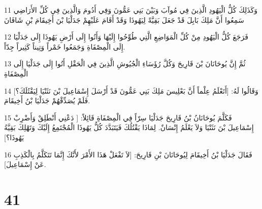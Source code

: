 \par 11 وَكَذَلِكَ كُلُّ الْيَهُودِ الَّذِينَ فِي مُوآبَ وَبَيْنَ بَنِي عَمُّونَ وَفِي أَدُومَ وَالَّذِينَ فِي كُلِّ الأَرَاضِي سَمِعُوا أَنَّ مَلِكَ بَابِلَ قَدْ جَعَلَ بَقِيَّةً لِيَهُوذَا وَقَدْ أَقَامَ عَلَيْهِمْ جَدَلْيَا بْنَ أَخِيقَامَ بْنِ شَافَانَ
\par 12 فَرَجَعَ كُلُّ الْيَهُودِ مِنْ كُلِّ الْمَوَاضِعِ الَّتِي طُوِّحُوا إِلَيْهَا وَأَتُوا إِلَى أَرْضِ يَهُوذَا إِلَى جَدَلْيَا إِلَى الْمِصْفَاةِ وَجَمَعُوا خَمْراً وَتِيناً كَثِيراً جِدّاً.
\par 13 ثُمَّ إِنَّ يُوحَانَانَ بْنَ قَارِيحَ وَكُلَّ رُؤَسَاءِ الْجُيُوشِ الَّذِينَ فِي الْحَقْلِ أَتُوا إِلَى جَدَلْيَا إِلَى الْمِصْفَاةِ
\par 14 وَقَالُوا لَهُ: [أَتَعْلَمُ عِلْماً أَنَّ بَعْلِيسَ مَلِكَ بَنِي عَمُّونَ قَدْ أَرْسَلَ إِسْمَاعِيلَ بْنَ نَثَنْيَا لِيَقْتُلَكَ؟] فَلَمْ يُصَدِّقْهُمْ جَدَلْيَا بْنُ أَخِيقَامَ.
\par 15 فَكَلَّمَ يُوحَانَانُ بْنُ قَارِيحَ جَدَلْيَا سِرّاً فِي الْمِصْفَاةِ قَائِلاً: [ دَعْنِي أَنْطَلِقْ وَأَضْرِبْ إِسْمَاعِيلَ بْنَ نَثَنْيَا وَلاَ يَعْلَمُ إِنْسَانٌ. لِمَاذَا يَقْتُلُكَ فَيَتَبَدَّدَ كُلُّ يَهُوذَا الْمُجْتَمِعُ إِلَيْكَ وَتَهْلِكَ بَقِيَّةُ يَهُوذَا؟]
\par 16 فَقَالَ جَدَلْيَا بْنُ أَخِيقَامَ لِيُوحَانَانَ بْنِ قَارِيحَ: [لاَ تَفْعَلْ هَذَا الأَمْرَ لأَنَّكَ إِنَّمَا تَتَكَلَّمُ بِالْكَذِبِ عَنْ إِسْمَاعِيلَ].

\chapter{41}


